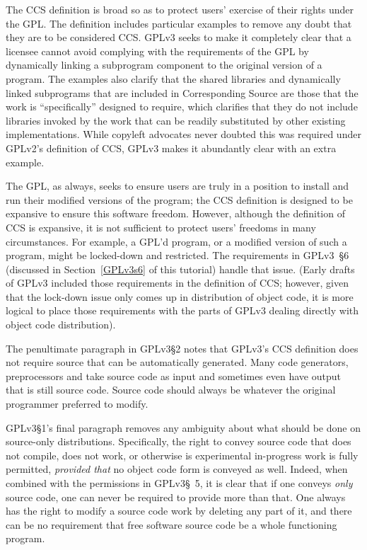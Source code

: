 The CCS definition is broad so as to protect users' exercise of their rights
under the GPL\@.  The definition includes particular examples to remove
any doubt that they are to be considered CCS\@.  GPLv3 seeks to make it
completely clear that a licensee cannot avoid complying with the requirements
of the GPL by dynamically linking a subprogram component to the original
version of a program.  The examples also clarify that the shared libraries
and dynamically linked subprograms that are included in Corresponding Source
are those that the work is ``specifically'' designed to require, which
clarifies that they do not include libraries invoked by the work that can be
readily substituted by other existing implementations.  While copyleft
advocates never doubted this was required under GPLv2's definition of CCS,
GPLv3 makes it abundantly clear with an extra example.

The GPL, as always, seeks to ensure users are truly in a position to install and
run their modified versions of the program; the CCS definition is designed to
be expansive to ensure this software freedom.  However, although the
definition of CCS is expansive, it is not sufficient to protect users'
freedoms in many circumstances.  For example, a GPL'd program, or a modified
version of such a program, might be locked-down and restricted.  The
requirements in GPLv3~\S6 (discussed in Section~\ref{GPLv3s6} of this
tutorial) handle that issue.  (Early drafts of GPLv3 included those
requirements in the definition of CCS; however, given that the lock-down
issue only comes up in distribution of object code, it is more logical to
place those requirements with the parts of GPLv3 dealing directly with object
code distribution).

The penultimate paragraph in GPLv3\S2 notes that GPLv3's CCS definition does
not require source that can be automatically generated.  Many code
generators, preprocessors and take source code as input and sometimes even
have output that is still source code.  Source code should always be whatever
the original programmer preferred to modify.

GPLv3\S1's final paragraph removes any ambiguity about what should be done on
source-only distributions.  Specifically, the right to convey source code
that does not compile, does not work, or otherwise is experimental
in-progress work is fully permitted, \textit{provided that} no object code
form is conveyed as well.  Indeed, when combined with the permissions in
GPLv3\S~5, it is clear that if one conveys \textit{only} source code, one can
never be required to provide more than that.  One always has the right to
modify a source code work by deleting any part of it, and there can be no
requirement that free software source code be a whole functioning program.

